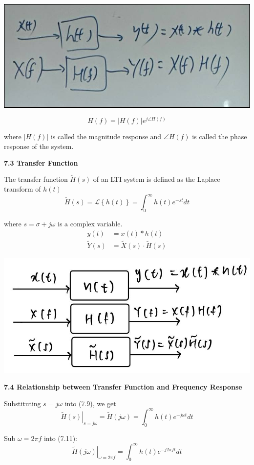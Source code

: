 \documentclass[landscape,a4paper]{extarticle}
\newenvironment{Figure}
  {\par\medskip\noindent\minipage{\linewidth}}
  {\endminipage\par\medskip}
\newcommand{\lap}[1]{\mathcal{L}\left\{#1\right\}}
\begin{document}
\begin{multicols*}{5}
    \begin{Figure}
        \centering
        \includegraphics[width=0.6\linewidth]{LTI_hf_ht.jpg}
    \end{Figure}

    \[
        H(f) = |H(f)| e^{j \angle H(f)} \tag{7.8}
    \]

    where $|H(f)|$ is called the magnitude response and $\angle H(f)$ is called the phase response of the system.

    \textbf{7.3 Transfer Function}

    The transfer function $\tilde{H}(s)$ of an LTI system is defined as the Laplace transform of $h(t)$
    \[
        \tilde{H}(s) = \lap{h(t)} = \int_{0}^{\infty}h(t) e^{-st} dt \tag{7.9}
    \]

    where $s = \sigma + j \omega$ is a complex variable.
    \begin{align*}
        y(t) &= x(t) * h(t)\\
        \tilde{Y}(s) &= \tilde{X}(s) \cdot \tilde{H}(s) \tag{7.10}
    \end{align*}
    \begin{Figure}
        \centering
        \includegraphics[width=0.7\linewidth]{LTI_ht_hf_hs.jpg}        
    \end{Figure}

    \textbf{7.4 Relationship between Transfer Function and Frequency Response}

    Substituting $s = j \omega$ into (7.9), we get 
    \[
        \left.\tilde{H}(s)\right|_{s=j\omega} = \tilde{H}(j \omega) = \int_{0}^{\infty}h(t)e^{-j \omega t} dt \tag{7.11}
    \]

    Sub $\omega = 2 \pi f$ into (7.11):
    \[
        \left.\tilde{H}(j\omega)\right|_{\omega = 2\pi f} = \int_{0}^{\infty} h(t) e^{-j2\pi f t}dt \tag{7.12}
    \]


\end{multicols*}
\end{document}
